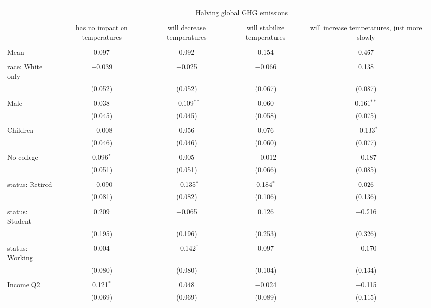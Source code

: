 
\begin{tabular}{@{\extracolsep{5pt}}lcccc} 
\\[-1.8ex]\hline 
\hline \\[-1.8ex] 
 & \multicolumn{4}{c}{Halving global GHG emissions} \\ 
\cline{2-5} 
\\[-1.8ex] & has no impact on temperatures & will decrease temperatures & will stabilize temperatures & will increase temperatures, just more slowly \\ 
\hline \\[-1.8ex] 
 Mean & 0.097 & 0.092 & 0.154 & 0.467  \\ \hline \\[-1.8ex] race: White only & $-$0.039 & $-$0.025 & $-$0.066 & 0.138 \\ 
  & (0.052) & (0.052) & (0.067) & (0.087) \\ 
  & & & & \\ 
 Male & 0.038 & $-$0.109$^{**}$ & 0.060 & 0.161$^{**}$ \\ 
  & (0.045) & (0.045) & (0.058) & (0.075) \\ 
  & & & & \\ 
 Children & $-$0.008 & 0.056 & 0.076 & $-$0.133$^{*}$ \\ 
  & (0.046) & (0.046) & (0.060) & (0.077) \\ 
  & & & & \\ 
 No college & 0.096$^{*}$ & 0.005 & $-$0.012 & $-$0.087 \\ 
  & (0.051) & (0.051) & (0.066) & (0.085) \\ 
  & & & & \\ 
 status: Retired & $-$0.090 & $-$0.135$^{*}$ & 0.184$^{*}$ & 0.026 \\ 
  & (0.081) & (0.082) & (0.106) & (0.136) \\ 
  & & & & \\ 
 status: Student & 0.209 & $-$0.065 & 0.126 & $-$0.216 \\ 
  & (0.195) & (0.196) & (0.253) & (0.326) \\ 
  & & & & \\ 
 status: Working & 0.004 & $-$0.142$^{*}$ & 0.097 & $-$0.070 \\ 
  & (0.080) & (0.080) & (0.104) & (0.134) \\ 
  & & & & \\ 
 Income Q2 & 0.121$^{*}$ & 0.048 & $-$0.024 & $-$0.115 \\ 
  & (0.069) & (0.069) & (0.089) & (0.115) \\ 

\end{tabular}
